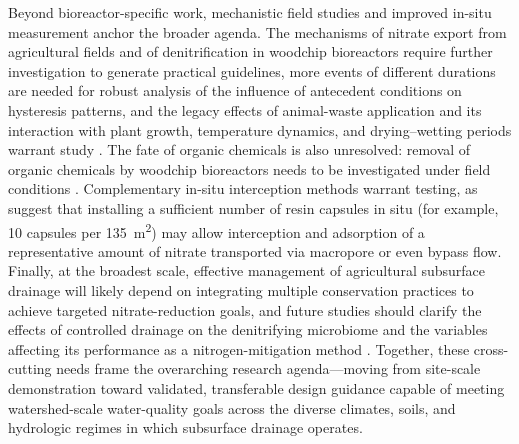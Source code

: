 Beyond bioreactor-specific work, mechanistic field studies and improved in-situ measurement anchor the broader agenda. The mechanisms of nitrate export from agricultural fields and of denitrification in woodchip bioreactors require further investigation to generate practical guidelines, more events of different durations are needed for robust analysis of the influence of antecedent conditions on hysteresis patterns, and the legacy effects of animal-waste application and its interaction with plant growth, temperature dynamics, and drying--wetting periods warrant study \parencite{Liu2020}. The fate of organic chemicals is also unresolved: removal of organic chemicals by woodchip bioreactors needs to be investigated under field conditions \parencite{Ilhan2011}. Complementary in-situ interception methods warrant testing, as \textcite{Pampolino2000} suggest that installing a sufficient number of resin capsules in situ (for example, 10 capsules per 135~m\textsuperscript{2}) may allow interception and adsorption of a representative amount of nitrate transported via macropore or even bypass flow. Finally, at the broadest scale, effective management of agricultural subsurface drainage will likely depend on integrating multiple conservation practices to achieve targeted nitrate-reduction goals, and future studies should clarify the effects of controlled drainage on the denitrifying microbiome and the variables affecting its performance as a nitrogen-mitigation method \parencite{Wang2025b}. Together, these cross-cutting needs frame the overarching research agenda---moving from site-scale demonstration toward validated, transferable design guidance capable of meeting watershed-scale water-quality goals across the diverse climates, soils, and hydrologic regimes in which subsurface drainage operates.